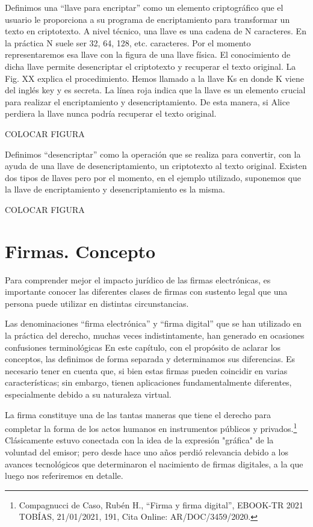\documentclass[12pt]{report} %
\begin{document}
\begin{itemize}
Definimos una “llave para encriptar” como un elemento criptográfico que el usuario le proporciona a su programa de encriptamiento para transformar un texto en criptotexto. A nivel técnico, una llave es una cadena de N caracteres. En la práctica N suele ser 32, 64, 128, etc. caracteres. Por el momento representaremos esa llave con la figura de una llave física. El conocimiento de dicha llave permite desencriptar el criptotexto y recuperar el texto original. La Fig. XX explica el procedimiento. Hemos llamado a la llave Ks en donde K viene del inglés key y  es secreta. La línea roja indica que la llave es un elemento crucial para realizar el encriptamiento y desencriptamiento. De esta manera, si Alice perdiera la llave nunca podría recuperar el texto original.
 
COLOCAR FIGURA

Definimos “desencriptar” como la operación que se realiza para convertir, con la ayuda de una llave de desencriptamiento, un criptotexto al texto original. Existen dos tipos de llaves pero por el momento, en el ejemplo utilizado, suponemos que la llave de encriptamiento y desencriptamiento es la misma.
 
COLOCAR FIGURA

\section{Firmas. Concepto}

Para comprender mejor el impacto jurídico de las firmas electrónicas, es importante conocer las diferentes clases de firmas con sustento legal que una persona puede utilizar en distintas circunstancias. 

Las denominaciones “firma electrónica” y “firma digital” que se han utilizado en la práctica del derecho, muchas veces indistintamente, han generado en ocasiones confusiones terminológicas En este capítulo, con el propósito de aclarar los conceptos, las definimos de forma separada y determinamos sus diferencias. Es necesario tener en cuenta que, si bien estas firmas pueden coincidir en varias características; sin embargo, tienen aplicaciones fundamentalmente diferentes, especialmente debido a su naturaleza virtual.

La firma constituye una de las tantas maneras que tiene el derecho para completar la forma de los actos humanos en instrumentos públicos y privados.\footnote{Compagnucci de Caso, Rubén H., “Firma y firma digital”, EBOOK-TR 2021 TOBÍAS, 21/01/2021, 191, Cita Online: AR/DOC/3459/2020.}  Clásicamente estuvo conectada con la idea de la expresión "gráfica" de la voluntad del emisor; pero desde hace uno años perdió relevancia debido a los avances tecnológicos que determinaron el nacimiento de firmas digitales, a la que luego nos referiremos en detalle.


\end{itemize}
\end{document}
